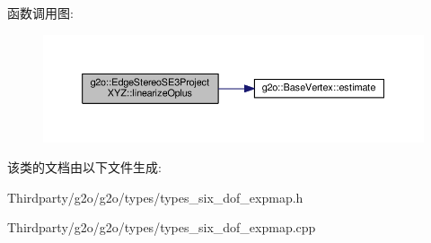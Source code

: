 函数调用图\-:
\nopagebreak
\begin{figure}[H]
\begin{center}
\leavevmode
\includegraphics[width=350pt]{classg2o_1_1EdgeStereoSE3ProjectXYZ_aea04d86a304c6cb4e2a3f34b35166f30_cgraph}
\end{center}
\end{figure}




该类的文档由以下文件生成\-:\begin{DoxyCompactItemize}
\item 
Thirdparty/g2o/g2o/types/types\-\_\-six\-\_\-dof\-\_\-expmap.\-h\item 
Thirdparty/g2o/g2o/types/types\-\_\-six\-\_\-dof\-\_\-expmap.\-cpp\end{DoxyCompactItemize}

